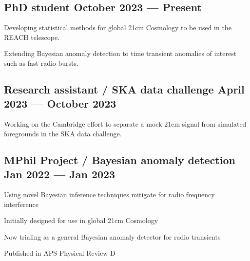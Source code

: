 \subsection{{PhD student \hfill October 2023 --- Present}}
\begin{zitemize}
\item Developing statistical methods for global 21cm Cosmology to be used in the REACH telescope.
\item Extending Bayesian anomaly detection to time transient anomalies of interest such as fast radio bursts.
\end{zitemize}

\subsection{{Research assistant / SKA data challenge \hfill April 2023 --- October 2023}}
\begin{zitemize}
\item Working on the Cambridge effort to separate a mock 21cm signal from simulated foregrounds in the SKA data challenge.
\end{zitemize}

\subsection{{MPhil Project / Bayesian anomaly detection \hfill Jan 2022 --- Jan 2023}}
\begin{zitemize}
\item Using novel Bayesian inference techniques mitigate for radio frequency interference
\item Initially designed for use in global 21cm Cosmology
\item Now trialing as a general Bayesian anomaly detector for radio transients
\item Published in APS Physical Review D
\end{zitemize}

